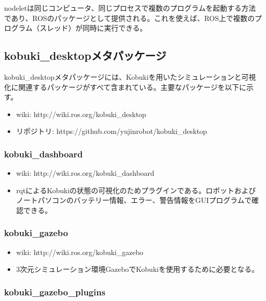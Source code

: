 \begin{itemize}
\begin{exercise}[nodeletとは?]
nodeletは同じコンピュータ、同じプロセスで複数のプログラムを起動する方法であり、ROSのパッケージとして提供される。これを使えば、ROS上で複数のプログラム（スレッド）が同時に実行できる。
\end{exercise}

\subsection{kobuki\_desktopメタパッケージ}

kobuki\_desktopメタパッケージには、Kobukiを用いたシミュレーションと可視化に関連するパッケージがすべて含まれている。主要なパッケージを以下に示す。

\begin{itemize}
\item wiki: http://wiki.ros.org/kobuki\_desktop
\item リポジトリ: https://github.com/yujinrobot/kobuki\_desktop
\end{itemize}

\subsubsection{kobuki\_dashboard}

\begin{itemize}
 \item wiki:  http://wiki.ros.org/kobuki\_dashboard
\item rqtによるKobukiの状態の可視化のためプラグインである。ロボットおよびノートパソコンのバッテリー情報、エラー、警告情報をGUIプログラムで確認できる。
\end{itemize}

\subsubsection{kobuki\_gazebo}

\begin{itemize}
\item wiki: http://wiki.ros.org/kobuki\_gazebo
\item 3次元シミュレーション環境GazeboでKobukiを使用するために必要となる。
\end{itemize}

\subsubsection{kobuki\_gazebo\_plugins}


\end{itemize}

